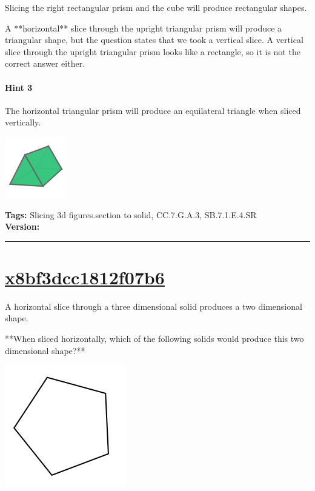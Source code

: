 \documentclass[twocolumn,10pt]{article}
\def\shrinkfactor{0.4}
\begin{document}
Slicing the right rectangular prism and the cube \DIFaddbegin {}\DIFaddend will produce rectangular shapes\DIFdelbegin {}\DIFdelend \DIFaddbegin {}\DIFaddend .

A **horizontal** slice through the upright triangular prism will produce a triangular shape, but the question states that we took a vertical slice.
A vertical slice through the upright triangular prism looks like a rectangle, so it is not the correct answer either.

\paragraph{Hint 3}The horizontal triangular prism will produce an equilateral triangle when sliced vertically.  

\includegraphics[scale=\shrinkfactor]{figures/14c5d54ad8e900843fbf2ef335f5a5a14d651f5b.png}



\medskip
\noindent
\textbf{Tags:} {\footnotesize Slicing 3d figures.section to solid, CC.7.G.A.3, SB.7.1.E.4.SR}\\
\textbf{Version:} \DIFdelbegin {}\DIFdelend \DIFaddbegin {}\DIFaddend \smallskip\hrule





\section{\href{https://www.khanacademy.org/devadmin/content/items/x8bf3dcc1812f07b6}{x8bf3dcc1812f07b6}}

\noindent
A horizontal slice through a three dimensional solid produces a two dimensional shape.

**When sliced horizontally, which of the following solids would produce this two dimensional shape?**   

\includegraphics[scale=\shrinkfactor]{figures/f6f3d7d862af181c9db9337ad959b4868e25835c.png} 
\end{document}
